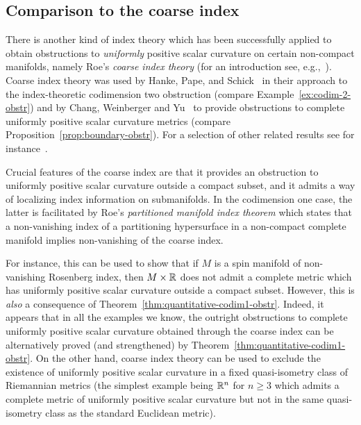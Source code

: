 \documentclass[pdftex]{sigma}
\numberwithin{equation}{section}
\begin{document}
\subsection{Comparison to the coarse index}\label{subsec:coarse}
There is another kind of index theory which has been successfully applied to obtain obstructions to \emph{uniformly} positive scalar curvature on certain non-compact manifolds, namely Roe's \emph{coarse index theory} (for an introduction see, e.g.,~\cite{Roe:IndexTheoryCoarseGeometry}).
Coarse index theory was used by Hanke, Pape,
and Schick~\cite{HankePapeSchick:CodimensionTwoIndex} in their approach to the index-theoretic codimension two obstruction (compare Example~\ref{ex:codim-2-obstr}) and by Chang, Weinberger and Yu~\cite{ChangWeinbergerYu:Taming3} to provide obstructions to complete uniformly positive scalar curvature metrics (compare Proposition~\ref{prop:boundary-obstr}).
For a selection of other related results see for instance~\cite{Chang:CoarseObstrArithmetic,Engel:WrongWay,Engel:Rough,SchickZadeh:MultiPart, Zeidler:IndexObstructionPositive}.

Crucial features of the coarse index are that it provides an obstruction to uniformly positive scalar curvature outside a compact subset, and it admits a way of localizing index information on submanifolds.
In the codimension one case, the latter is facilitated by Roe's \emph{partitioned manifold index theorem} which states that a non-vanishing index of a partitioning hypersurface in a non-compact complete manifold implies non-vanishing of the coarse index.

For instance, this can be used to show that if \(M\) is a spin manifold of non-vanishing Rosenberg index, then \(M \times \mathbb{R}\) does not admit a complete metric which has uniformly positive scalar curvature outside a compact subset.
However, this is \emph{also} a consequence of Theorem~\ref{thm:quantitative-codim1-obstr}.
Indeed, it appears that in all the examples we know, the outright obstructions to complete uniformly positive scalar curvature obtained through the coarse index can be alternatively proved (and strengthened) by Theorem~\ref{thm:quantitative-codim1-obstr}.
On the other hand, coarse index theory can be used to exclude the existence of uniformly positive scalar curvature in a fixed quasi-isometry class of Riemannian metrics (the simplest example being \(\mathbb{R}^n\) for \(n \geq 3\) which admits a complete metric of uniformly positive scalar curvature but not in the same quasi-isometry class as the standard Euclidean metric).
\end{document}
